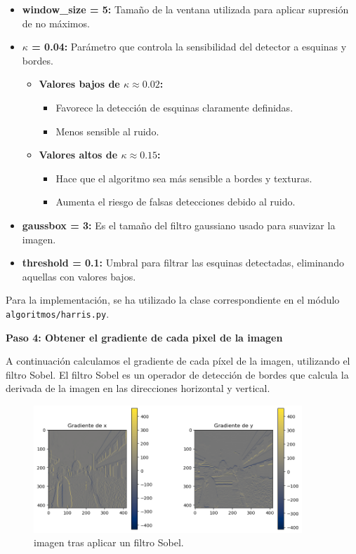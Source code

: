 \documentclass[a4paper]{article}
\begin{document}
\begin{itemize}
    \item \textbf{window\_size = 5:} Tamaño de la ventana utilizada para aplicar supresión de no máximos.
    \item \textbf{\(\kappa\) = 0.04:} Parámetro que controla la sensibilidad del detector a esquinas y bordes.
    \begin{itemize}
        \item \textbf{Valores bajos de \(\kappa \approx 0.02\):} 
        \begin{itemize}
            \item Favorece la detección de esquinas claramente definidas.
            \item Menos sensible al ruido.
        \end{itemize}
        \item \textbf{Valores altos de \(\kappa \approx 0.15\):} 
        \begin{itemize}
            \item Hace que el algoritmo sea más sensible a bordes y texturas.
            \item Aumenta el riesgo de falsas detecciones debido al ruido.
        \end{itemize}
    \end{itemize}
    \item \textbf{gaussbox = 3:} Es el tamaño del filtro gaussiano usado para suavizar la imagen.
    \item \textbf{threshold = 0.1:} Umbral para filtrar las esquinas detectadas, eliminando aquellas con valores bajos.
\end{itemize}

Para la implementación, se ha utilizado la clase correspondiente en el módulo \texttt{algoritmos/harris.py}.	

\par\vspace{0.5cm}
\textbf{Paso 4: Obtener el gradiente de cada pixel de la imagen}
\par\vspace{0.5cm}

A continuación calculamos el gradiente de cada píxel de la imagen, utilizando el filtro Sobel. 
El filtro Sobel es un operador de detección de bordes que calcula la derivada de la imagen en las direcciones horizontal y vertical.

\begin{figure}[H]
    \centering
    \includegraphics[width=0.9\textwidth]{images/harris_paso_3.png}
    \caption{imagen tras aplicar un filtro Sobel.}
\end{figure}
\end{document}
